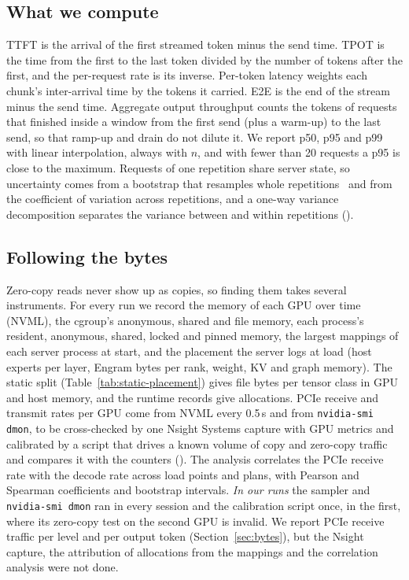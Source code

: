 \subsection{What we compute}
TTFT is the arrival of the first streamed token minus the send time. TPOT is the time from the first to the last token
divided by the number of tokens after the first, and the per-request rate is its inverse. Per-token latency weights
each chunk's inter-arrival time by the tokens it carried. E2E is the end of the stream minus the send time. Aggregate
output throughput counts the tokens of requests that finished inside a window from the first send (plus a warm-up) to
the last send, so that ramp-up and drain do not dilute it. We report p50, p95 and p99 with linear interpolation, always
with $n$, and with fewer than 20 requests a p95 is close to the maximum. Requests of one repetition share server state,
so uncertainty comes from a bootstrap that resamples whole repetitions~\citep{efron1994bootstrap} and from the
coefficient of variation across repetitions, and a one-way variance decomposition separates the variance between and
within repetitions ().

\subsection{Following the bytes}
Zero-copy reads never show up as copies, so finding them takes several instruments. For every run we record the memory
of each GPU over time (NVML), the cgroup's anonymous, shared and file memory, each process's resident, anonymous,
shared, locked and pinned memory, the largest mappings of each server process at start, and the placement the server
logs at load (host experts per layer, Engram bytes per rank, weight, KV and graph memory). The static split
(Table~\ref{tab:static-placement}) gives file bytes per tensor class in GPU and host memory, and the runtime records
give allocations. PCIe receive and transmit rates per GPU come from NVML every 0.5\,s and from
\texttt{nvidia-smi dmon}, to be cross-checked by one Nsight Systems capture with GPU metrics and calibrated by a script
that drives a known volume of copy and zero-copy traffic and compares it with the counters
(). The analysis correlates the PCIe receive rate with the decode rate
across load points and plans, with Pearson and Spearman coefficients and bootstrap intervals. \emph{In our runs} the
sampler and \texttt{nvidia-smi dmon} ran in every session and the calibration script once, in the first, where its
zero-copy test on the second GPU is invalid. We report PCIe receive traffic per level and per output token
(Section~\ref{sec:bytes}), but the Nsight capture, the attribution of allocations from the mappings and the
correlation analysis were not done.

